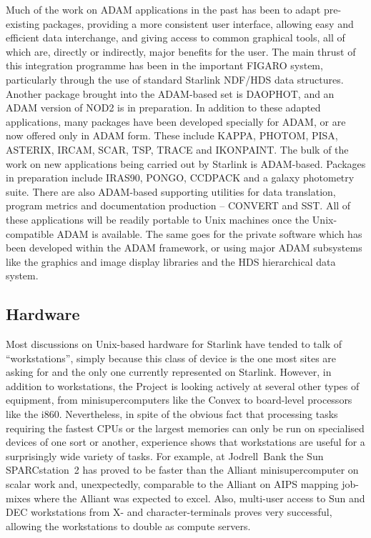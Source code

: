 Much of the work on ADAM applications in the past has been to adapt
pre-existing packages, providing a more consistent user interface,
allowing easy and efficient data interchange, and giving access to
common graphical tools, all of which are, directly or indirectly,
major benefits for the user.  The main thrust of this integration
programme has been in the important FIGARO system, particularly through
the use of standard Starlink NDF/HDS data structures.  Another package
brought into the ADAM-based set is DAOPHOT, and an ADAM version of NOD2
is in preparation.  In addition to these adapted applications, many
packages have been developed specially for ADAM, or are now offered
only in ADAM form.  These include KAPPA, PHOTOM, PISA, ASTERIX, IRCAM,
SCAR, TSP, TRACE and IKONPAINT.  The bulk of the work on new
applications being carried out by Starlink is ADAM-based.  Packages in
preparation include IRAS90, PONGO, CCDPACK and a galaxy photometry
suite.  There are also ADAM-based supporting utilities
for data translation, program metrics and documentation production --
CONVERT and SST.  All of these applications will be readily portable to
Unix machines once the Unix-compatible ADAM is available.  The same goes
for the private software which has been developed within the ADAM
framework, or using major ADAM subsystems like the graphics and image
display libraries and the HDS hierarchical data system.

\subsection{Hardware}
Most discussions on Unix-based hardware for Starlink have tended to talk
of ``workstations'', simply because this class of device is the one most
sites are asking for and the only one currently represented on Starlink.
However, in addition to workstations, the Project is looking actively at
several other types of equipment, from minisupercomputers like the
Convex to board-level processors like the i860.  Nevertheless, in spite
of the obvious fact that processing tasks requiring the fastest CPUs or
the largest memories can only be run on specialised devices of one sort
or another, experience shows that workstations are useful for a
surprisingly wide variety of tasks.  For example, at Jodrell~Bank the
Sun SPARCstation~2 has proved to be faster than the Alliant
minisupercomputer on scalar work and, unexpectedly, comparable to the
Alliant on AIPS mapping job-mixes where the Alliant was expected to
excel.  Also, multi-user access to Sun and DEC workstations from X- and
character-terminals proves very successful, allowing the workstations to
double as compute servers.

